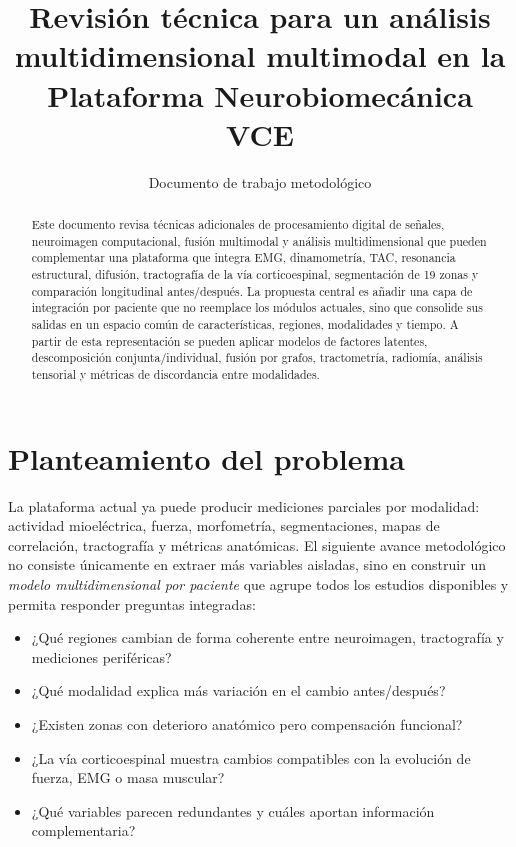 \documentclass[conference]{IEEEtran}
\title{Revisión técnica para un análisis multidimensional multimodal en la Plataforma Neurobiomecánica VCE}
\author{Documento de trabajo metodológico}
\date{}
\begin{document}
\maketitle

\begin{abstract}
Este documento revisa técnicas adicionales de procesamiento digital de señales, neuroimagen computacional, fusión multimodal y análisis multidimensional que pueden complementar una plataforma que integra EMG, dinamometría, TAC, resonancia estructural, difusión, tractografía de la vía corticoespinal, segmentación de 19 zonas y comparación longitudinal antes/después. La propuesta central es añadir una capa de integración por paciente que no reemplace los módulos actuales, sino que consolide sus salidas en un espacio común de características, regiones, modalidades y tiempo. A partir de esta representación se pueden aplicar modelos de factores latentes, descomposición conjunta/individual, fusión por grafos, tractometría, radiomía, análisis tensorial y métricas de discordancia entre modalidades.
\end{abstract}

\section{Planteamiento del problema}
La plataforma actual ya puede producir mediciones parciales por modalidad: actividad mioeléctrica, fuerza, morfometría, segmentaciones, mapas de correlación, tractografía y métricas anatómicas. El siguiente avance metodológico no consiste únicamente en extraer más variables aisladas, sino en construir un \textit{modelo multidimensional por paciente} que agrupe todos los estudios disponibles y permita responder preguntas integradas:

\begin{itemize}[leftmargin=*]
    \item ¿Qué regiones cambian de forma coherente entre neuroimagen, tractografía y mediciones periféricas?
    \item ¿Qué modalidad explica más variación en el cambio antes/después?
    \item ¿Existen zonas con deterioro anatómico pero compensación funcional?
    \item ¿La vía corticoespinal muestra cambios compatibles con la evolución de fuerza, EMG o masa muscular?
    \item ¿Qué variables parecen redundantes y cuáles aportan información complementaria?
\end{itemize}
\end{document}
